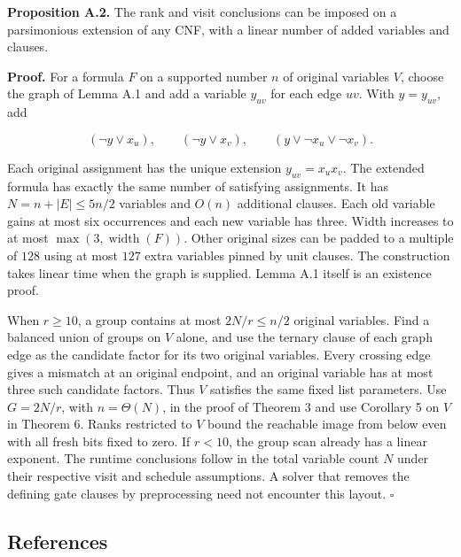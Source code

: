 \documentclass[
  10pt,
]{article}
\begin{document}
\textbf{Proposition A.2.} The rank and visit conclusions can be imposed
on a parsimonious extension of any CNF, with a linear number of added
variables and clauses.

\textbf{Proof.} For a formula \(F\) on a supported number \(n\) of
original variables \(V\), choose the graph of Lemma A.1 and add a
variable \(y_{uv}\) for each edge \(uv\). With \(y=y_{uv}\), add

\[
      (\neg y\lor x_u),\qquad(\neg y\lor x_v),\qquad
      (y\lor\neg x_u\lor\neg x_v).
\]

Each original assignment has the unique extension \(y_{uv}=x_ux_v\). The
extended formula has exactly the same number of satisfying assignments.
It has \(N=n+|E|\le5n/2\) variables and \(O(n)\) additional clauses.
Each old variable gains at most six occurrences and each new variable
has three. Width increases to at most
\(\max(3,\operatorname{width}(F))\). Other original sizes can be padded
to a multiple of \(128\) using at most \(127\) extra variables pinned by
unit clauses. The construction takes linear time when the graph is
supplied. Lemma A.1 itself is an existence proof.

When \(r\ge10\), a group contains at most \(2N/r\le n/2\) original
variables. Find a balanced union of groups on \(V\) alone, and use the
ternary clause of each graph edge as the candidate factor for its two
original variables. Every crossing edge gives a mismatch at an original
endpoint, and an original variable has at most three such candidate
factors. Thus \(V\) satisfies the same fixed list parameters. Use
\(G=2N/r\), with \(n=\Theta(N)\), in the proof of Theorem 3 and use
Corollary 5 on \(V\) in Theorem 6. Ranks restricted to \(V\) bound the
reachable image from below even with all fresh bits fixed to zero. If
\(r<10\), the group scan already has a linear exponent. The runtime
conclusions follow in the total variable count \(N\) under their
respective visit and schedule assumptions. A solver that removes the
defining gate clauses by preprocessing need not encounter this layout.
\(\square\)

\subsection{References}\label{references}
\end{document}
